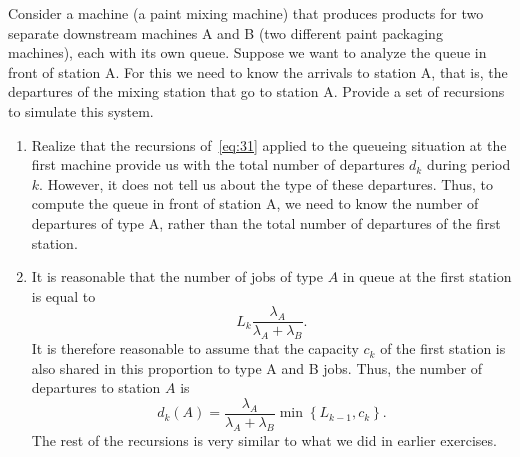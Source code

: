 \begin{extra}
  Consider a machine (a paint mixing machine) that produces products for two separate downstream machines A and B (two different paint packaging machines), each with its own queue.
  Suppose we want to analyze the queue in front of station A.
  For this we need to know the arrivals to station A, that is, the departures of the mixing station that go to station A.
  Provide a set of recursions to simulate this system.
\begin{solution}
\begin{enumerate}
\item Realize that the recursions of~\cref{eq:31} applied to the queueing situation at the first machine provide us with the total number of departures $d_k$ during period $k$.
  However, it does not tell us about the type of these departures.
  Thus, to compute the queue in front of station A, we need to know the number of departures of type A, rather than the total number of departures of the first station.
\item It is reasonable that the number of jobs of type $A$ in queue at
  the first station is equal to
  \begin{equation*}
  L_k \frac{\lambda_A}{\lambda_A + \lambda_B}.
  \end{equation*}
  It is therefore reasonable to assume that the capacity $c_k$ of the
  first station is also shared in this proportion to type A and B
  jobs. Thus, the number of departures to station $A$ is
  \begin{equation*}
    d_k(A) = \frac{\lambda_A}{\lambda_A+\lambda_B} \min\left\{ L_{k-1}, c_k\right\}.
  \end{equation*}
 The rest of the recursions is very similar to what we did in earlier exercises.
\end{enumerate}
\end{solution}
\end{extra}





